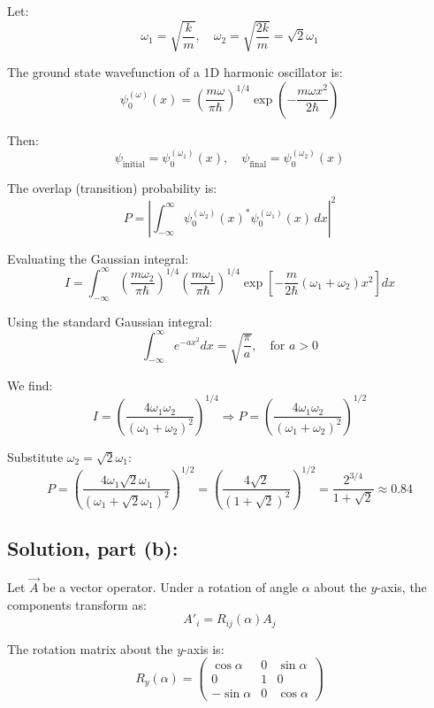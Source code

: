 \documentclass[12pt]{article}
\begin{document}
        Let:
        \[
            \omega_1 = \sqrt{\frac{k}{m}}, \quad \omega_2 = \sqrt{\frac{2k}{m}} = \sqrt{2} \omega_1
        \]
        
        The ground state wavefunction of a 1D harmonic oscillator is:
        \[
            \psi_0^{(\omega)}(x) = \left( \frac{m \omega}{\pi \hbar} \right)^{1/4} \exp\left( - \frac{m \omega x^2}{2\hbar} \right)
        \]
        
        Then:
        \[
            \psi_{\text{initial}} = \psi_0^{(\omega_1)}(x), \quad
            \psi_{\text{final}} = \psi_0^{(\omega_2)}(x)
        \]
        
        The overlap (transition) probability is:
        \[
            P = \left| \int_{-\infty}^{\infty} \psi_0^{(\omega_2)}(x)^* \psi_0^{(\omega_1)}(x) \, dx \right|^2
        \]
        
        Evaluating the Gaussian integral:
        \[
            I = \int_{-\infty}^{\infty}
            \left( \frac{m \omega_2}{\pi \hbar} \right)^{1/4}
            \left( \frac{m \omega_1}{\pi \hbar} \right)^{1/4}
            \exp\left[ - \frac{m}{2\hbar} (\omega_1 + \omega_2) x^2 \right] dx
        \]
        
        Using the standard Gaussian integral:
        \[
            \int_{-\infty}^{\infty} e^{-a x^2} dx = \sqrt{\frac{\pi}{a}}, \quad \text{for } a > 0
        \]
        
        We find:
        \[
            I = \left( \frac{4 \omega_1 \omega_2}{(\omega_1 + \omega_2)^2} \right)^{1/4}
            \Rightarrow
            P = \left( \frac{4 \omega_1 \omega_2}{(\omega_1 + \omega_2)^2} \right)^{1/2}
        \]
        
        Substitute \( \omega_2 = \sqrt{2} \omega_1 \):
        \[
            P = \left( \frac{4 \omega_1 \sqrt{2} \omega_1}{\left( \omega_1 + \sqrt{2} \omega_1 \right)^2} \right)^{1/2}
            = \left( \frac{4\sqrt{2}}{(1 + \sqrt{2})^2} \right)^{1/2}
            = \frac{2^{3/4}}{1 + \sqrt{2}} \approx \boldsymbol{\boxed{0.84}}
        \]

    \subsection{Solution, part (b):}
        Let \( \vec{A} \) be a vector operator. Under a rotation of angle \( \alpha \) about the \( y \)-axis, the components transform as:
        \[
            A'_i = R_{ij}(\alpha) A_j
        \]
        
        The rotation matrix about the \( y \)-axis is:
        \[
            R_y(\alpha) =
            \begin{pmatrix}
                \cos \alpha & 0 & \sin \alpha \\
                0 & 1 & 0 \\
                - \sin \alpha & 0 & \cos \alpha
            \end{pmatrix}
        \]
        
\end{document}
